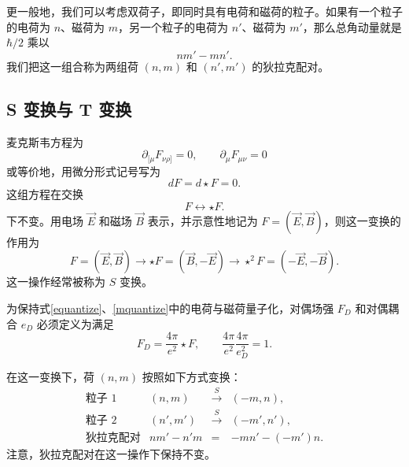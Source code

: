 更一般地，我们可以考虑双荷子，即同时具有电荷和磁荷的粒子。如果有一个粒子的电荷为 $n$、磁荷为 $m$，另一个粒子的电荷为 $n'$、磁荷为 $m'$，那么总角动量就是 $\hbar/2$ 乘以
\begin{equation}
 nm'-mn'.
\end{equation}
我们把这一组合称为两组荷 $(n,m)$ 和 $(n',m')$ 的狄拉克配对。

\subsection{S 变换与 T 变换}\label{ST}
麦克斯韦方程为
\begin{equation}
\partial_{[\mu}F_{\nu\rho]}=0,\qquad
\partial_{\mu}F_{\mu\nu}=0
\end{equation}
或等价地，用微分形式记号写为
\begin{equation}
dF=d\star F=0.
\end{equation}
这组方程在交换
\begin{equation}
F\leftrightarrow \star F.
\end{equation}
下不变。用电场 $\vec E$ 和磁场 $\vec B$ 表示，并示意性地记为 $F=(\vec E,\vec B)$，则这一变换的作用为
\begin{equation}
F=(\vec E,\vec B) \longrightarrow
\star F=(\vec B,-\vec E) \longrightarrow
\star^2 F=(-\vec E,-\vec B).
\end{equation}
这一操作经常被称为 $S$ 变换。

为保持式\eqref{equantize}、\eqref{mquantize}中的电荷与磁荷量子化，对偶场强 $F_D$ 和对偶耦合 $e_D$ 必须定义为满足
\begin{equation}
F_D=\frac{4\pi}{e^2}{}\star F,\qquad
\frac{4\pi}{e^2}\frac{4\pi}{e_D^2}=1.
\end{equation}

在这一变换下，荷 $(n,m)$ 按照如下方式变换：
\begin{equation}
\begin{array}{r|ccc}
\text{粒子 1} & (n,m) & \stackrel{S}{\longrightarrow} & (-m,n), \\
\text{粒子 2} &(n',m') & \stackrel{S}{\longrightarrow} & (-m',n'), \\
\text{狄拉克配对} & nm'-n'm & = &  -mn'-(-m')n.
\end{array}
\end{equation}
注意，狄拉克配对在这一操作下保持不变。

